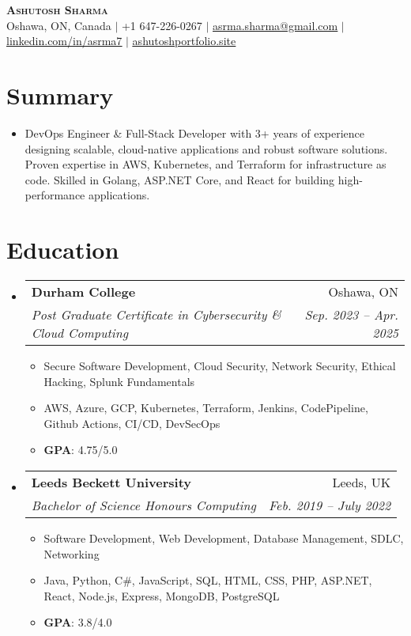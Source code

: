 \documentclass[letterpaper,11pt]{article}
\makeatletter
\newcommand{\resumeItem}[1]{
  \item\small{
    {#1 \vspace{-2pt}}
  }
}
\newcommand{\resumeSubheading}[4]{
  \vspace{-2pt}\item
    \begin{tabular*}{0.97\textwidth}[t]{l@{\extracolsep{\fill}}r}
      \textbf{#1} & #2 \\
      \textit{\small#3} & \textit{\small #4} \\
    \end{tabular*}\vspace{-7pt}
}
\newcommand{\resumeSubHeadingListStart}{\begin{itemize}[leftmargin=0.15in, label={}]}
\newcommand{\resumeSubHeadingListEnd}{\end{itemize}}
\newcommand{\resumeItemListStart}{\begin{itemize}}
\newcommand{\resumeItemListEnd}{\end{itemize}\vspace{-5pt}}
\makeatother
\begin{document}

\begin{center}
    \textbf{\Huge \scshape Ashutosh Sharma} \\ \vspace{1pt}
    {Oshawa, ON, Canada} $|$
    \small +1 647-226-0267 $|$ \href{mailto:asrma.sharma@gmail.com}{\underline{asrma.sharma@gmail.com}} $|$ 
    \href{https://linkedin.com/in/asrma7}{\underline{linkedin.com/in/asrma7}} $|$
    \href{https://ashutoshportfolio.site}{\underline{ashutoshportfolio.site}}
\end{center}


\section{Summary}
  \resumeSubHeadingListStart
    \item{
      {DevOps Engineer \& Full-Stack Developer with 3+ years of experience designing scalable, cloud-native applications and robust software solutions.}
      {Proven expertise in AWS, Kubernetes, and Terraform for infrastructure as code.}
      {Skilled in Golang, ASP.NET Core, and React for building high-performance applications.}
    }
  \resumeSubHeadingListEnd


\section{Education}
  \resumeSubHeadingListStart
    \resumeSubheading
      {Durham College}{Oshawa, ON}
      {Post Graduate Certificate in Cybersecurity \& Cloud Computing}{Sep. 2023 -- Apr. 2025}
      \resumeItemListStart
        \resumeItem{Secure Software Development, Cloud Security, Network Security, Ethical Hacking, Splunk Fundamentals}
        \resumeItem{AWS, Azure, GCP, Kubernetes, Terraform, Jenkins, CodePipeline, Github Actions, CI/CD, DevSecOps}
        \resumeItem{\textbf{GPA}: 4.75/5.0}
      \resumeItemListEnd
    \resumeSubheading
      {Leeds Beckett University}{Leeds, UK}
      {Bachelor of Science Honours Computing}{Feb. 2019 -- July 2022}
        \resumeItemListStart
            \resumeItem{Software Development, Web Development, Database Management, SDLC, Networking}
            \resumeItem{Java, Python, C\#, JavaScript, SQL, HTML, CSS, PHP, ASP.NET, React, Node.js, Express, MongoDB, PostgreSQL}
            \resumeItem{\textbf{GPA}: 3.8/4.0}
        \resumeItemListEnd
  \resumeSubHeadingListEnd
\end{document}
